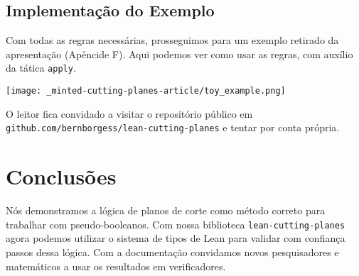 \documentclass[conference]{IEEEtran}
\begin{document}

\newpage
\subsection{Implementação do Exemplo}
Com todas as regras necessárias, prosseguimos para um exemplo retirado da apresentação
(Apêncide F). Aqui podemos ver como usar as regras, com auxílio da tática \texttt{apply}.

\texttt{[image: \_minted-cutting-planes-article/toy\_example.png]}

O leitor fica convidado a visitar o repositório público em \texttt{github.com/bernborgess/lean-cutting-planes}
e tentar por conta própria.


\section*{Conclusões}
Nós demonstramos a lógica de planos de corte como método correto para trabalhar com pseudo-booleanos.
Com nossa biblioteca \texttt{lean-cutting-planes} agora podemos utilizar o sistema de tipos de Lean
para validar com confiança passos dessa lógica. Com a documentação convidamos novos pesquisadores e
matemáticos a usar os resultados em verificadores.


\end{document}

